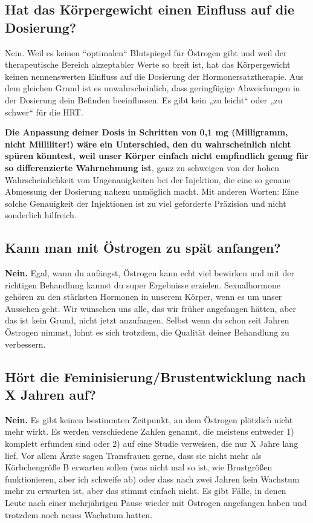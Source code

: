 \documentclass{article}
\begin{document}
{{{\subsection{Hat das Körpergewicht einen Einfluss auf die Dosierung?}

Nein. Weil es keinen “optimalen“ Blutspiegel für Östrogen gibt und weil der therapeutische Bereich akzeptabler Werte so breit ist, hat das Körpergewicht keinen nennenswerten Einfluss auf die Dosierung der Hormonersatztherapie. Aus dem gleichen Grund ist es unwahrscheinlich, dass geringfügige Abweichungen in der Dosierung dein Befinden beeinflussen. Es gibt kein „zu leicht“ oder „zu schwer“ für die HRT.

\textbf{Die Anpassung deiner Dosis in Schritten von 0,1 mg (Milligramm, nicht Milliliter!) wäre ein Unterschied, den du wahrscheinlich nicht spüren könntest, weil unser Körper einfach nicht empfindlich genug für so differenzierte Wahrnehmung ist}, ganz zu schweigen von der hohen Wahrscheinlichkeit von Ungenauigkeiten bei der Injektion, die eine so genaue Abmessung der Dosierung nahezu unmöglich macht. Mit anderen Worten: Eine solche Genauigkeit der Injektionen ist zu viel geforderte Präzision und nicht sonderlich hilfreich.

\subsection{Kann man mit Östrogen zu spät anfangen?}\label{11-5}

\textbf{Nein.} Egal, wann du anfängst, Östrogen kann echt viel bewirken und mit der richtigen Behandlung kannst du super Ergebnisse erzielen. Sexualhormone gehören zu den stärksten Hormonen in unserem Körper, wenn es um unser Aussehen geht. Wir wünschen uns alle, das wir früher angefangen hätten, aber das ist kein Grund, nicht jetzt anzufangen. Selbst wenn du schon seit Jahren Östrogen nimmst, lohnt es sich trotzdem, die Qualität deiner Behandlung zu verbessern.

\subsection{Hört die Feminisierung/Brustentwicklung nach X Jahren auf?}\label{11-6}

\textbf{Nein.} Es gibt keinen bestimmten Zeitpunkt, an dem Östrogen plötzlich nicht mehr wirkt. Es werden verschiedene Zahlen genannt, die meistens entweder 1) komplett erfunden sind oder 2) auf eine Studie verweisen, die nur X Jahre lang lief. Vor allem Ärzte sagen Transfrauen gerne, dass sie nicht mehr als Körbchengröße B erwarten sollen (was nicht mal so ist, wie Brustgrößen funktionieren, aber ich schweife ab) oder dass nach zwei Jahren kein Wachstum mehr zu erwarten ist, aber das stimmt einfach nicht. Es gibt Fälle, in denen Leute nach einer mehrjährigen Pause wieder mit Östrogen angefangen haben und trotzdem noch neues Wachstum hatten.

}}}
\end{document}

